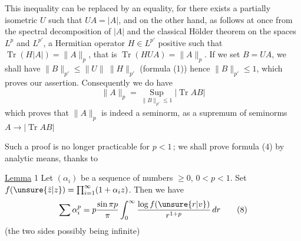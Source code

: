 This inequality can be replaced by an equality,
for there exists a partially isometric  $U$ such that
$UA=|A|$,  and on the other hand, as
follows at once from the spectral decomposition of
$|A|$ and the classical Hölder theorem on the
spaces $L^p$ and $L^{p'}$, a Hermitian operator
$H\in L^{p'}$ positive such that $\operatorname{Tr}(H|A|)=\|A\|_p$,
that is \deleted{\unsure{$|$}}$\operatorname{Tr}(HUA)$\deleted{\unsure{$|$}}$=\|A\|_p$. If we set
$B=UA$, we shall have $\|B\|_{p'}\leq\|U\|\ \|H\|_{p'}$ (formula
(1)) hence $\|B\|_{p'}\leq1$, which proves our assertion.
Consequently we do have
\[
\|A\|_p=\operatorname*{Sup}_{\|B\|_{p'}\leq1}|\operatorname{Tr}AB|\tag*{(7)}
\]
which proves that $\|A\|_p$ is indeed a
seminorm, as a supremum of
seminorms $A\to|\operatorname{Tr}AB|$

Such a proof is no longer practicable
for $p<1$\,;  we shall prove formula (4)
by analytic means, thanks to

\uline{Lemma} 1 \quad Let $(\alpha_i)$ be a  sequence  of
\margin{\rule[-3.9cm]{0.4pt}{4.1cm}}numbers $\geq0$, 
  $0<p<1$. Set $f(\unsure{\bar z|z})=\prod_{i=1}^{\infty}(1+\alpha_i z)$.
Then we have
\[
\sum\alpha_i^p=p\frac{\sin\pi p}{\pi}\int_0^\infty\frac{\log f(\unsure{r|v})}{r^{1+p}}\,dr\tag*{(8)}
\]
(the two sides possibly
being infinite)
